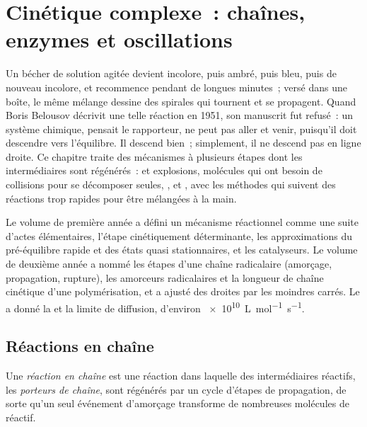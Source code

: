 \chapter{Cinétique complexe~: chaînes, enzymes et oscillations}\label{ch:b3:complex-kinetics}

Un bécher de solution agitée devient incolore, puis ambré, puis bleu,
puis de nouveau incolore, et recommence pendant de longues minutes~;
versé dans une boîte, le même mélange dessine des spirales qui tournent
et se propagent. Quand Boris Belousov décrivit une telle réaction en
1951, son manuscrit fut refusé~: un système chimique, pensait le
rapporteur, ne peut pas aller et venir, puisqu'il doit descendre vers
l'équilibre. Il descend bien~; simplement, il ne descend pas en ligne
droite. Ce chapitre traite des mécanismes à plusieurs étapes dont les
intermédiaires sont régénérés~:  et explosions,
molécules qui ont besoin de collisions pour se décomposer seules,
, et , avec les méthodes qui suivent des
réactions trop rapides pour être mélangées à la main.

\begin{recall}
Le volume de première année a défini un mécanisme réactionnel comme une
suite d'actes élémentaires, l'étape cinétiquement déterminante, les
approximations du pré-équilibre rapide et des états quasi stationnaires,
et les catalyseurs. Le volume de deuxième année a nommé les étapes d'une
chaîne radicalaire (amorçage, propagation, rupture), les amorceurs
radicalaires et la longueur de chaîne cinétique d'une polymérisation, et
a ajusté des droites par les moindres carrés. Le
 a donné la  et
la limite de diffusion, d'environ \qty{e10}{L.mol^{-1}.s^{-1}}.
\end{recall}

\section{Réactions en chaîne}

\begin{definition}\label{def:b3:complex-kinetics:chain}
Une \emph{réaction en chaîne} est une réaction dans
laquelle des intermédiaires réactifs, les \emph{porteurs de
chaîne}, sont régénérés par
un cycle d'étapes de propagation, de sorte qu'un seul événement
d'amorçage transforme de nombreuses molécules de réactif.
\end{definition}

